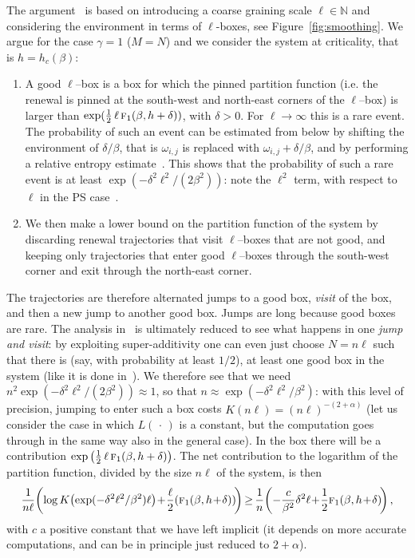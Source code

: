 \documentclass[10pt]{amsart}
\theoremstyle{definition}\newtheorem{defi}[theo]{Definition}\newtheorem{rema}[theo]{Remark}\newtheorem{exam}[theo]{Example}\newtheorem{exem}[theo]{Example}\newtheorem{nota}[theo]{Notation}
\newcommand{\ga}{\alpha}
\newcommand{\gb}{\beta}
\newcommand{\gd}{\delta}
\newcommand{\go}{\omega}
\newcommand{\tf}{\textsc{f}} %
\newcommand{\bbN}{\ensuremath{\mathbb{N}}}
\newcommand*{\Mk}{\mkern -2mu}
\begin{document}
The argument~\cite{cf:GT06} is based on introducing a coarse graining scale $\ell \in \bbN$ and considering the environment in terms of $\ell$-boxes, see Figure~\ref{fig:smoothing}. We argue for the case $\gamma=1$ ($M=N$) and we consider the system at criticality, that is $h=h_c(\gb)$:
\begin{enumerate}
\item A good $\ell$--box is a box for which the pinned partition function (i.e. the renewal is pinned at the south-west and north-east corners of the $\ell$--box) is larger than $\exp(\tfrac12\,\ell\,\tf_1(\gb, h+ \gd))$, with $\gd>0$. For $\ell\to \infty$ this is a rare event. The probability of such an event can be estimated from below by shifting the environment of $\gd/\gb$, that is $\go_{i,j}$ is replaced with $\go_{i,j}+ \gd/\gb$, and by performing a relative entropy estimate~\cite[Chapter~5]{cf:G}. This shows that the probability of such a rare event is at least $\exp(-\gd^2 \ell^2 /(2 \gb^2))$: note the $\ell^2$ term, with respect to $\ell$ in the PS case~\cite{cf:GT06}.
\item We then make a lower bound on the partition function of the system by discarding renewal trajectories that visit $\ell$--boxes that are not good, and keeping only trajectories that enter good $\ell$--boxes through the south-west corner and exit through the north-east corner.
\end{enumerate}


The trajectories are therefore alternated jumps to a good box, \emph{visit} of the box, and then a new jump to another good box. Jumps are long because good boxes are rare. The analysis in~\cite{cf:GT06} is ultimately reduced to see what happens in one \emph{jump and visit}: by exploiting super-additivity one can even just choose $N=n\ell$ such that there is (say, with probability at least $1/2$), at least one good box in the system (like it is done in~\cite{cf:BL11}). We therefore see that we need $n^2 \exp(-\gd^2 \ell^2 /(2 \gb^2))\approx 1$, so that $n \approx \exp(-\gd^2 \ell^2 / \gb^2)$: with this level of precision, jumping to enter such a box costs $K(n\ell) = (n\ell)^{-(2+\ga)}$ (let us consider the case in which $L({\,\cdot\,})$ is a constant, but the computation goes through in the same way also in the general case). In the box there will be a contribution $\exp\big(\tfrac12\,\ell\,\tf_1(\gb, h+ \gd) \big)$. The net contribution to the logarithm of the partition function, divided by the size $n\ell$ of the system, is then
\begin{equation}
\!\frac{1}{n \ell} \!\left(\log K\!\left(\exp(-\gd^2 \ell^2 / \gb^2) \ell \right)\!+\! \frac{\ell}{2} (\tf_1(\gb, h\!+\! \gd))\! \right) \Mk\ge\Mk \frac {1}{n} \!\left(-\frac{c}{\gb^2}\gd^2 \ell\!+\! \frac{1}{2} \tf_1(\gb, h\!+\! \gd)\! \right),\!
\end{equation}
with $c$ a positive constant that we have left implicit (it depends on more accurate computations, and can be in principle just reduced to $2+ \ga$).
\end{document}
